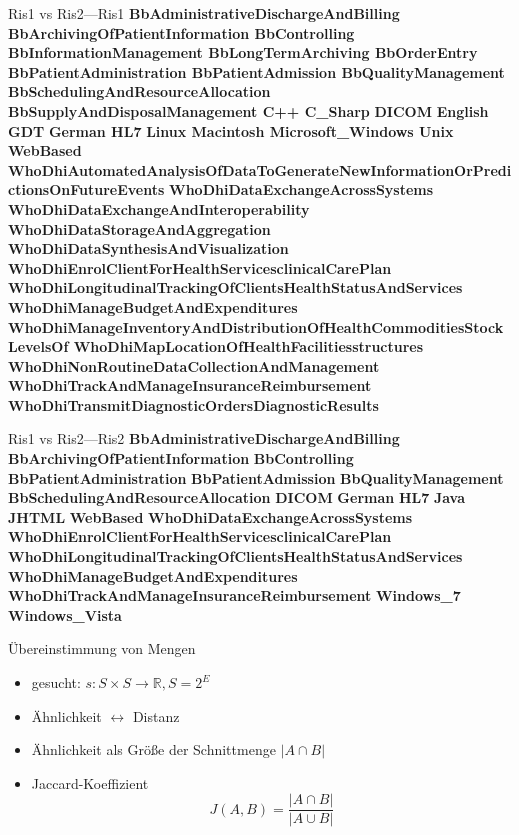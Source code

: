 \documentclass[aspectratio=1610]{beamer}
\newcommand{\both}[1]{{\color[rgb]{0.8,1,0.8}\textbf{#1}}}
\newcommand{\onlyone}[1]{{\color[rgb]{1,0.4,0.4}\textbf{#1}}}
\begin{document}
\begin{frame}{Ris1 vs Ris2---Ris1}
\both{
BbAdministrativeDischargeAndBilling
BbArchivingOfPatientInformation
BbControlling}
\onlyone{
BbInformationManagement
BbLongTermArchiving
BbOrderEntry}
\both{
BbPatientAdministration
BbPatientAdmission
BbQualityManagement
BbSchedulingAndResourceAllocation
}
\onlyone{
BbSupplyAndDisposalManagement
C++
C\_Sharp}
\both{
DICOM
}
\onlyone{
English
GDT
}
\both{
German
HL7
}
\onlyone{
Linux
Macintosh
Microsoft\_Windows
Unix
WebBased
}
\onlyone{WhoDhiAutomatedAnalysisOfDataToGenerateNewInformationOrPredictionsOnFutureEvents}
\both{WhoDhiDataExchangeAcrossSystems}
\onlyone{WhoDhiDataExchangeAndInteroperability
WhoDhiDataStorageAndAggregation
WhoDhiDataSynthesisAndVisualization}
\both{
WhoDhiEnrolClientForHealthServicesclinicalCarePlan
WhoDhiLongitudinalTrackingOfClientsHealthStatusAndServices
WhoDhiManageBudgetAndExpenditures}
\onlyone{
WhoDhiManageInventoryAndDistributionOfHealthCommoditiesStockLevelsOf
WhoDhiMapLocationOfHealthFacilitiesstructures
WhoDhiNonRoutineDataCollectionAndManagement
}
\both{WhoDhiTrackAndManageInsuranceReimbursement}
\onlyone{WhoDhiTransmitDiagnosticOrdersDiagnosticResults}
\end{frame}

\begin{frame}{Ris1 vs Ris2---Ris2}
\both{BbAdministrativeDischargeAndBilling}
\both{BbArchivingOfPatientInformation}
\both{BbControlling}
\both{BbPatientAdministration}
\both{BbPatientAdmission}
\both{BbQualityManagement}
\both{BbSchedulingAndResourceAllocation}
\both{DICOM}
\both{German}
\both{HL7}
\onlyone{Java}
\onlyone{JHTML}
\both{WebBased}
\both{WhoDhiDataExchangeAcrossSystems}
\both{WhoDhiEnrolClientForHealthServicesclinicalCarePlan}
\both{WhoDhiLongitudinalTrackingOfClientsHealthStatusAndServices}
\both{WhoDhiManageBudgetAndExpenditures}
\both{WhoDhiTrackAndManageInsuranceReimbursement}
\onlyone{Windows\_7}
\onlyone{Windows\_Vista}
\end{frame}

\begin{frame}{Übereinstimmung von Mengen}
\begin{itemize}
\item gesucht: $s: S \times S \rightarrow  \mathbb{R}, S = 2^E$
\item Ähnlichkeit $\leftrightarrow$ Distanz
\pause
\item Ähnlichkeit als Größe der Schnittmenge $|A \cap B|$
\pause
\item Jaccard-Koeffizient \[J(A,B) = \frac{|A \cap B|}{|A \cup B|}\]
\end{itemize}
\end{frame}
\end{document}
